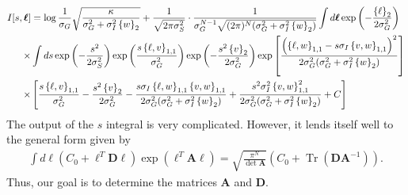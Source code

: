 \documentclass[11pt]{article}
\DeclareMathOperator{\Tr}{Tr}
\begin{document}
\begin{align}
	I[s,\boldsymbol{\ell}] &= \log \frac{1}{\sigma_G}\sqrt{\frac{\kappa}{\sigma_G^2 +\sigma_I^2 \left\{w\right\}_2}}  +\frac{1}{\sqrt{2\pi \sigma_S^2}}\cdot \frac{1}{\sigma_G^{N-1}\sqrt{(2\pi)^N(\sigma_G^2 + \sigma_I^2 \left\{w\right\}_2)}} \int d\boldsymbol{\ell} \exp\left(-\frac{\left\{\ell \right\}_2}{2\sigma_G^2}\right) \notag \\
	 \times & \int ds \exp\left(-\frac{s^2}{2\sigma_S^2}\right)\exp\left(\frac{s\left\{\ell, v\right\}_{1,1}}{\sigma_G^2} \right)\exp\left(-\frac{s^2 \left\{v\right\}_2}{2\sigma_G^2}\right)\exp\left[\frac{\left(\left\{\ell, w\right\}_{1,1} - s \sigma_I \left\{v,w\right\}_{1,1}\right)^2}{2\sigma_G^2 (\sigma_G^2 + \sigma_I^2 \left\{w\right\}_2)}\right] \notag \\
	 \times & \left[\frac{s \left\{\ell, v\right\}_{1,1}}{\sigma_G^2} - \frac{s^2 \left\{v\right\}_2}{2\sigma_G^2} - \frac{s \sigma_I\left\{\ell, w\right\}_{1,1} \left\{v,w\right\}_{1,1}}{2\sigma_G^2 (\sigma_G^2 + \sigma_I^2 \left\{w\right\}_2)}+\frac{s^2 \sigma_I^2\left\{v,w\right\}_{1,1}^2}{2\sigma_G^2 (\sigma_G^2 + \sigma_I^2 \left\{w\right\}_2)} + C\right]
\end{align}
The output of the $s$ integral is very complicated. However, it lends itself well to the general form given by
\begin{align}
	\int d\boldsymbol{\ell} \left(C_0 +\boldsymbol{\ell}^T \mathbf{D} \boldsymbol{\ell}\right)\exp\left(\boldsymbol{\ell}^T \mathbf{A} \boldsymbol{\ell}\right) = \sqrt{\frac{\pi^N}{\det \mathbf{A}}}\left(C_0 + \Tr\left(\mathbf{D}\mathbf{A}^{-1}\right)\right).
\end{align}
Thus, our goal is to determine the matrices $\mathbf{A}$ and $\mathbf{D}$. 
\end{document}
